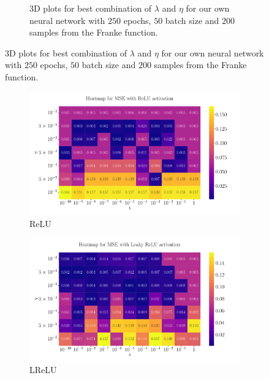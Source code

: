 \documentclass[%
reprint,
amsmath,amssymb,
aps,
]{revtex4-2}
\begin{document}
\begin{figure}[ht!]
\begin{subfigure}[b]{0.49\textwidth}
	\caption{3D plots for best combination of $\lambda$ and $\eta$ for our own neural network with $250$ epochs, $50$ batch size and $200$ samples from the Franke function.}
	\label{fig:NN_noKeras_3D_Franke_Epochs250}
\end{subfigure}
\end{figure}

\begin{figure}[ht!]
	\begin{subfigure}{0.4353\textwidth}
		\includegraphics[width=\textwidth]{Python/Figures/Heatmap_MSE_ReLU_Franke_Epochs250.pdf}
		\caption{ReLU}
	\end{subfigure}
	\hfill
	\begin{subfigure}{0.4353\textwidth}
		\includegraphics[width=\textwidth]{Python/Figures/Heatmap_MSE_Leaky ReLU_Franke_Epochs250.pdf}
		\caption{LReLU}
	\end{subfigure}
	\hfill\newline
	\begin{subfigure}{0.4353\textwidth}

\end{subfigure}
\end{figure}
\end{document}
